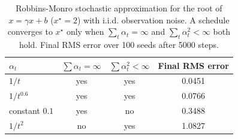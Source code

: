 \begin{table}[h]
\centering
\caption{Robbins-Monro stochastic approximation for the root of $x = \gamma x + b$ ($x^\star = 2$) with i.i.d. observation noise. A schedule converges to $x^\star$ only when $\sum_t \alpha_t = \infty$ and $\sum_t \alpha_t^2 < \infty$ both hold. Final RMS error over 100 seeds after 5000 steps.}
\label{tab:prelim_robbins_monro}
\begin{tabular}{lccc}
\hline
$\alpha_t$ & $\sum \alpha_t = \infty$ & $\sum \alpha_t^2 < \infty$ & Final RMS error \\
\hline
$1/t$ & yes & yes & 0.0451 \\
$1/t^{0.6}$ & yes & yes & 0.0766 \\
constant $0.1$ & yes & no & 0.3488 \\
$1/t^{2}$ & no & yes & 1.0827 \\
\hline
\end{tabular}
\end{table}
